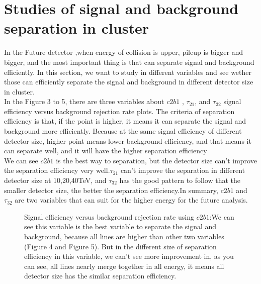 \section{Studies of signal and background separation in cluster}
In the Future detector ,when energy of collision is upper, pileup is bigger and bigger, and the most important thing is that can separate signal and background efficiently. In this section, we want to study in different variables and see wether those can efficiently separate the signal and background in different detector size in cluster.\\

In the Figure 3 to 5, there are three variables about $c2b1$ , $\tau_{21}$, and $\tau_{32}$ signal efficiency versus background rejection rate plots. The criteria of separation efficiency is that, if the point is higher, it means it can separate the signal and background more efficiently.  Because at the same signal efficiency of different detector size, higher point means lower background efficiency, and that means it can separate well, and it will have the higher separation efficiency\\

We can see  $c2b1$ is the best way to separation, but the detector size can't improve the separation efficiency very well.$\tau_{21}$ can't improve the separation in different detector size at 10,20,40TeV, and $\tau_{32}$ has the good pattern to follow that the smaller detector size, the better the separation efficiency.In summary, $c2b1$ and $\tau_{32}$ are two variables that can suit for the higher energy for the future analysis.\\
\label{sec:efficiency}


\begin{figure}
\begin{center}
\end{center}
\caption{Signal efficiency versus background rejection rate using $c2b1$:We can see this variable is the best variable to separate the signal and background, because all lines are higher than other two variables (Figure 4 and Figure 5). But in the different size of separation efficiency in this variable, we can't see more improvement in, as you can see, all lines nearly merge together in all energy, it means all detector size has the similar separation efficiency.}
\label{fig:cluster_c2b1}
\end{figure}


